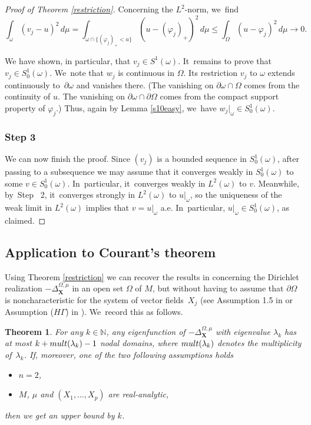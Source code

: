 \documentclass[11pt]{article}
\newcommand{\mult}{\textup{mult}}
\newcommand{\bX}{{\boldsymbol{X}}}
\newtheorem{theorem}{Theorem}[section]
\theoremstyle{definition}
\let\phi\varphi
\let\Xb\bX
\newcommand{\1}{\mathbbm{1}}
\numberwithin{equation}{section}
\begin{document}
\begin{proof}[Proof of Theorem \ref{restriction}]
Concerning the $L^2$-norm, we~find
\[
\int_\omega (v_j - u)^2\,d\mu = \int_{\omega\cap\{ (\phi_j)_+< u\}} (u - (\phi_j)_+)^2\,d\mu
\leq \int_\Omega (u-\phi_j)^2\,d\mu \to 0.
\]

We have shown, in particular, that $v_j\in S^1(\omega)$. It~remains to prove that $v_j\in S^1_0(\omega)$. We~note that $w_j$ is continuous in $\Omega$. Its restriction $v_j$ to $\omega$ extends continuously to~$\partial\omega$ and vanishes there. (The vanishing on $\partial\omega\cap\Omega$ comes from the continuity of $u$. The vanishing on $\partial\omega\cap\partial\Omega$ comes from the compact support property of $\phi_j$.) Thus, again by Lemma \ref{s10easy}, we~have $w_j|_\omega\in S^1_0(\omega)$.

\subsubsection*{Step 3} We can now finish the proof. Since $(v_j)$ is a bounded sequence in $S^1_0(\omega)$, after passing to a subsequence we may assume that it converges weakly in $S^1_0(\omega)$ to some $v\in S^1_0(\omega)$. In~particular, it~converges weakly in $L^2(\omega)$ to $v$. Meanwhile, by~Step~ 2, it~converges strongly in $L^2(\omega)$ to $u|_\omega$, so the uniqueness of the weak limit in $L^2(\omega)$ implies that $v=u|_\omega$ a.e. In~particular, $u|_\omega\in S^1_0(\omega)$, as claimed.
\end{proof}

\subsection{Application to Courant's theorem}\label{ss2.7}
Using Theorem \ref{restriction} we can recover the results in \cite{EL} concerning the Dirichlet realization $-\Delta^{\Omega,\mu}_\Xb$ in an open set $\Omega$ of $M$, but without having to assume that $\partial \Omega$ is noncharacteristic for the system of vector fields~$X_j$ (see Assumption 1.5 in \cite{EL} or Assumption ($H\Gamma$) in \cite{De}). We~record this as follows.

\begin{theorem}\label{courant}
For any $k\in \mathbb N$, any eigenfunction of $-\Delta_\Xb^{\Omega,\mu}$ with eigenvalue $\lambda_k$ has at most
$k+ \mult(\lambda_k)-1$ nodal domains, where $\mult(\lambda_k)$ denotes the multiplicity of~$\lambda_k$.
If, moreover, one of the two following assumptions holds
\begin{itemize}
\item $n=2$,
\item $M$, $\mu$ and $(X_1,\dots, X_p)$ are real-analytic,
\end{itemize}
then we get an upper bound by $k$.
\end{theorem}
\end{document}
